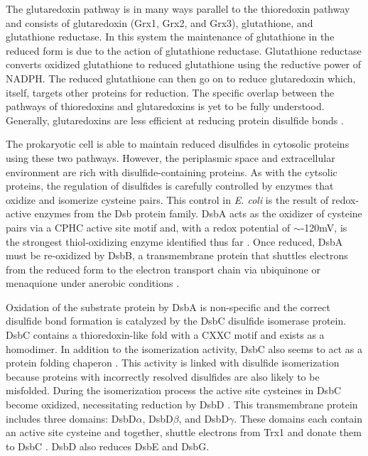 {%
The glutaredoxin pathway is in many ways parallel to the thioredoxin pathway
and consists of glutaredoxin (Grx1, Grx2, and Grx3), glutathione, and
glutathione reductase.  In this system the maintenance of glutathione in the
reduced form is due to the action of glutathione reductase.  Glutathione
reductase converts oxidized glutathione to reduced glutathione using the
reductive power of NADPH.  The reduced glutathione can then go on to reduce
glutaredoxin which, itself, targets other proteins for reduction.  The specific
overlap between the pathways of thioredoxins and glutaredoxins is yet to be
fully understood.  Generally, glutaredoxins are less efficient at reducing
protein disulfide bonds \cite{47,48,17}. 


The prokaryotic cell is able to maintain reduced disulfides in cytosolic
proteins using these two pathways.  However, the periplasmic space and
extracellular environment are rich with disulfide-containing proteins.  As with
the cytsolic proteins, the regulation of disulfides is carefully controlled by
enzymes that oxidize and isomerize cysteine pairs. This control in \emph{E.
coli} is the result of redox-active enzymes from the Dsb protein family. DsbA
acts as the oxidizer of cysteine pairs via a CPHC
active site motif and, with a redox potential of $\sim$-120mV, is the strongest
thiol-oxidizing enzyme identified thus far \cite{59}. Once reduced, DsbA must be
re-oxidized by DsbB, a transmembrane protein that shuttles
electrons from the reduced form to the electron transport chain via ubiquinone
or menaquione under anerobic conditions \cite{87,88}.

Oxidation of the substrate protein by DsbA is non-specific and the correct
disulfide bond formation is catalyzed by the DsbC disulfide isomerase protein.
DsbC contains a thioredoxin-like fold with a CXXC motif and exists as a
homodimer. In addition to the isomerization activity, DsbC also seems to act as
a protein folding chaperon \cite{67,68}.  This activity is linked with
disulfide isomerization because proteins with incorrectly resolved disulfides
are also likely to be misfolded.  During the isomerization process the active
site cysteines in DsbC become oxidized, necessitating reduction by DsbD
\cite{54,78}.  This transmembrane protein includes three domains: DsbD$\alpha$,
DsbD$\beta$, and DsbD$\gamma$.  These domains each contain an active site
cysteine and together, shuttle electrons from Trx1 and donate them to DsbC
\cite{64,79}. DsbD also reduces DsbE and DsbG.

}
